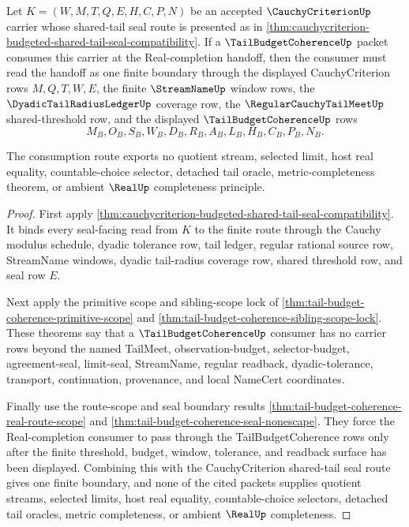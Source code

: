 \begin{theorem}
\label{thm:cauchy-criterion-tail-budget-coherence-consumption}
Let $K=(W,M,T,Q,E,H,C,P,N)$ be an accepted $\CauchyCriterionUp$ carrier whose shared-tail seal route is presented as in \autoref{thm:cauchycriterion-budgeted-shared-tail-seal-compatibility}. If a $\TailBudgetCoherenceUp$ packet consumes this carrier at the Real-completion handoff, then the consumer must read the handoff as one finite boundary through the displayed CauchyCriterion rows $M,Q,T,W,E$, the finite $\StreamNameUp$ window rows, the $\DyadicTailRadiusLedgerUp$ coverage row, the $\RegularCauchyTailMeetUp$ shared-threshold row, and the displayed $\TailBudgetCoherenceUp$ rows
$$
M_B,O_B,S_B,W_B,D_B,R_B,A_B,L_B,H_B,C_B,P_B,N_B.
$$

The consumption route exports no quotient stream, selected limit, host real equality, countable-choice selector, detached tail oracle, metric-completeness theorem, or ambient $\RealUp$ completeness principle.
\end{theorem}
\begin{proof}
First apply \autoref{thm:cauchycriterion-budgeted-shared-tail-seal-compatibility}. It binds every seal-facing read from $K$ to the finite route through the Cauchy modulus schedule, dyadic tolerance row, tail ledger, regular rational source row, StreamName windows, dyadic tail-radius coverage row, shared threshold row, and seal row $E$.

Next apply the primitive scope and sibling-scope lock of \autoref{thm:tail-budget-coherence-primitive-scope} and \autoref{thm:tail-budget-coherence-sibling-scope-lock}. These theorems say that a $\TailBudgetCoherenceUp$ consumer has no carrier rows beyond the named TailMeet, observation-budget, selector-budget, agreement-seal, limit-seal, StreamName, regular readback, dyadic-tolerance, transport, continuation, provenance, and local NameCert coordinates.

Finally use the route-scope and seal boundary results \autoref{thm:tail-budget-coherence-real-route-scope} and \autoref{thm:tail-budget-coherence-seal-nonescape}. They force the Real-completion consumer to pass through the TailBudgetCoherence rows only after the finite threshold, budget, window, tolerance, and readback surface has been displayed. Combining this with the CauchyCriterion shared-tail seal route gives one finite boundary, and none of the cited packets supplies quotient streams, selected limits, host real equality, countable-choice selectors, detached tail oracles, metric completeness, or ambient $\RealUp$ completeness.
\end{proof}

